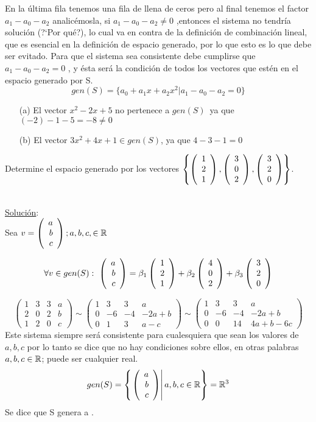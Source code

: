 En la \'ultima fila tenemos una fila de llena de ceros pero al final tenemos el factor $a_1-a_0-a_2$
analic\'emosla, si $a_1-a_0-a_2\neq 0$
,entonces el sistema no tendría soluci\'on (?`Por qu\'e?), lo cual va
en contra de la definici\'on de combinaci\'on lineal, que es esencial en la definición de espacio
generado, por lo que esto es lo que debe ser evitado. Para que el sistema sea consistente debe cumplirse que $a_1-a_0-a_2=0$
, y ésta será la condición de todos los vectores que est\'en en el
espacio generado por S.
\[gen(S)=
\lbrace
a_0+a_1 x+a_2 x^2|
a_1-a_0-a_2=0
\rbrace
\]
\begin{enumerate}

\item[(a)] El vector $x^2-2x+5$ no pertenece a $gen(S)$\ ya que $(-2)-1-5=-8\neq 0$
\item[(b)] El vector $3x^2+4x+1 \in gen(S)$, ya que $4-3-1=0$
\end{enumerate}

\begin{ejemplo}
Determine el espacio generado por los vectores $\left\{ \left( \begin{array}{r} 1\\ 2\\ 1 \end{array} \right) , \left( \begin{array}{r} 3\\ 0\\ 2 \end{array} \right) , \left( \begin{array}{r} 3\\ 2\\ 0 \end{array} \right) \right\}$.
\end{ejemplo}

~\\
\underline{Soluci\'on}:
~\\

Sea $v=\left( \begin{array}{r} a\\ b\\ c \end{array} \right) ; a, b, c, \in \mathbb{R}$

\[
\forall v\in gen(S):\ 
\vectrtres{a}{b}{c}=
\beta_1\vectrtres{1}{2}{1}+
\beta_2\vectrtres{4}{0}{2}+
\beta_3\vectrtres{3}{2}{0}
\]

\[
\left(
\begin{array}{rrr|r}
1&3&3&a\\
2&0&2&b\\
1&2&0&c
\end{array}
\right)
\sim
\left(
\begin{array}{rrr|r}
1&3&3&a\\
0&-6&-4&-2a+b\\
0&1&3&a-c
\end{array}
\right)
\sim
\left(
\begin{array}{rrr|r}
1&3&3&a\\
0&-6&-4&-2a+b\\
0&0&14&4a+b-6c
\end{array}
\right)
\]
Este sistema siempre ser\'a consistente para cualesquiera que sean los valores de $a, b, c$ por lo
tanto se dice que no hay condiciones sobre ellos, en otras palabras $a, b, c \in \mathbb{R}$; puede ser
cualquier real.
\[
gen(S)=
\left\{
\left.
\left( \begin{array}{r} a\\ b\\ c \end{array} \right) \right|
a, b, c \in \mathbb{R}
\right\}=\mathbb{R}^3
\]
Se dice que S genera a \rtres.

